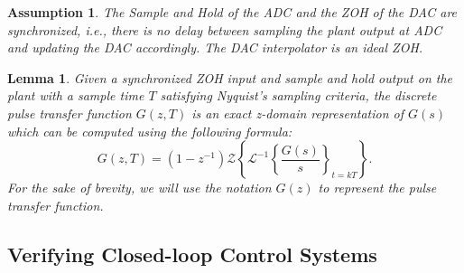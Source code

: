 \documentclass{sig-alternate-05-2015}
\newcommand{\red}[1]{{\color{red}#1}}
\newtheorem{myassumption}{Assumption}
\newtheorem{mylemma}{Lemma}
\begin{document}
\begin{myassumption}
%
The Sample and Hold of the ADC and the ZOH of the DAC are synchronized, {\it
i.e.}, there is no delay between sampling the plant output at ADC and
updating the DAC accordingly.  The DAC interpolator is an ideal ZOH.
%
\end{myassumption}

\begin{mylemma}\cite{astrom1997computer}
%
Given a synchronized ZOH input and sample and hold output on the plant with
a sample time $T$ satisfying Nyquist's sampling criteria, the discrete pulse
transfer function $G(z,T)$ is an exact z-domain representation of $G(s)$
which can be computed using the following formula:
%
\begin{equation}
\label{eq:pulsetf}
G(z,T) = (1-z^{-1})\mathcal{Z}\left\lbrace{\mathcal{L}^{-1}\left\lbrace{\frac{G(s)}{s}}\right\rbrace_{t=kT}}\right\rbrace.
\end{equation}
%
For the sake of brevity, we will use the notation $G(z)$ to represent the
pulse transfer function.
%
\end{mylemma}

\subsection{Verifying Closed-loop Control Systems}
\label{verifying-closed-loop-control-systems}



\end{document}
